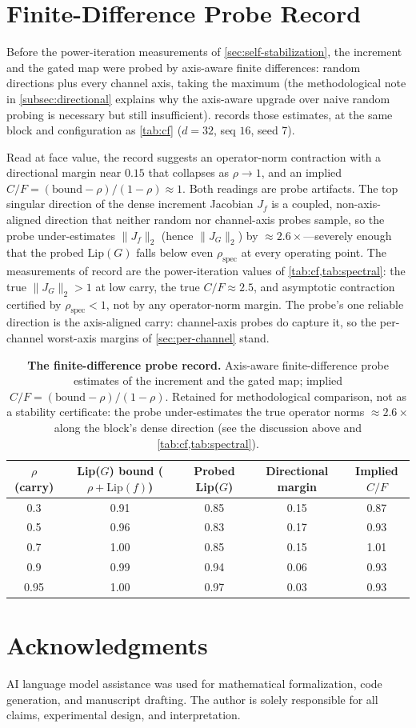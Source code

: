 \documentclass[11pt]{article}
\begin{document}
\section{Finite-Difference Probe Record}
\label{app:probe-record}

Before the power-iteration measurements of \cref{sec:self-stabilization}, the increment and the gated map were probed by axis-aware finite differences: random directions plus every channel axis, taking the maximum (the methodological note in \cref{subsec:directional} explains why the axis-aware upgrade over naive random probing is necessary but still insufficient).  records those estimates, at the same block and configuration as \cref{tab:cf} ($d=32$, seq $16$, seed 7).

Read at face value, the record suggests an operator-norm contraction with a directional margin near $0.15$ that collapses as $\rho \to 1$, and an implied $C/F = (\text{bound} - \rho)/(1-\rho) \approx 1$. Both readings are probe artifacts. The top singular direction of the dense increment Jacobian $J_f$ is a coupled, non-axis-aligned direction that neither random nor channel-axis probes sample, so the probe under-estimates $\|J_f\|_2$ (hence $\|J_G\|_2$) by $\approx 2.6\times$---severely enough that the probed $\text{Lip}(G)$ falls below even $\rho_{\text{spec}}$ at every operating point. The measurements of record are the power-iteration values of \cref{tab:cf,tab:spectral}: the true $\|J_G\|_2 > 1$ at low carry, the true $C/F \approx 2.5$, and asymptotic contraction certified by $\rho_{\text{spec}} < 1$, not by any operator-norm margin. The probe's one reliable direction is the axis-aligned carry: channel-axis probes do capture it, so the per-channel worst-axis margins of \cref{sec:per-channel} stand.

\begin{table}[ht]
\centering
\begin{tabular}{@{}ccccc@{}}
\toprule
$\rho$ (carry) & Lip($G$) bound ($\rho + \text{Lip}(f)$) & Probed Lip($G$) & Directional margin & Implied $C/F$ \\
\midrule
0.3 & 0.91 & 0.85 & 0.15 & 0.87 \\
0.5 & 0.96 & 0.83 & 0.17 & 0.93 \\
0.7 & 1.00 & 0.85 & 0.15 & 1.01 \\
0.9 & 0.99 & 0.94 & 0.06 & 0.93 \\
0.95 & 1.00 & 0.97 & 0.03 & 0.93 \\
\bottomrule
\end{tabular}
\caption{\textbf{The finite-difference probe record.} Axis-aware finite-difference probe estimates of the increment and the gated map; implied $C/F = (\text{bound}-\rho)/(1-\rho)$. Retained for methodological comparison, not as a stability certificate: the probe under-estimates the true operator norms $\approx 2.6\times$ along the block's dense direction (see the discussion above and \cref{tab:cf,tab:spectral}).}
\label{tab:directional-margin}
\end{table}


\section*{Acknowledgments}

AI language model assistance was used for mathematical formalization, code generation, and manuscript drafting. The author is solely responsible for all claims, experimental design, and interpretation.



\end{document}

